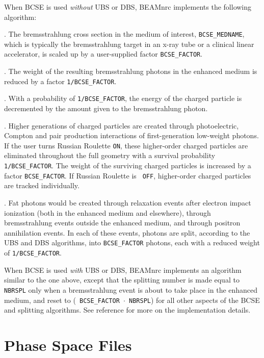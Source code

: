 \documentclass[12pt,twoside]{article}
\begin{document}
When BCSE is used {\em without} UBS or DBS, BEAMnrc implements the following
algorithm\cite{AR07}:

. The bremsstrahlung cross section in the medium of
interest, {\tt BCSE\_MEDNAME}, which is typically the bremsstrahlung target in
an x-ray tube or a clinical linear accelerator,
is scaled up by a user-supplied factor {\tt BCSE\_FACTOR}.

. The weight of the resulting bremsstrahlung photons in the
enhanced medium is reduced by a factor {\tt 1/BCSE\_FACTOR}.

. With a probability of {\tt 1/BCSE\_FACTOR}, the energy of
the charged particle is decremented by the amount given to the
bremsstrahlung photon.

. Higher generations of charged particles are created
through photoelectric, Compton and pair production interactions of
first-generation low-weight photons. If the user turns Russian
Roulette {\tt ON}, these higher-order charged particles are eliminated
throughout the full geometry with a survival probability {\tt
1/BCSE\_FACTOR}. The weight of the surviving charged particles is
increased by a factor {\tt BCSE\_FACTOR}. If Russian Roulette is {\tt
OFF}, higher-order charged particles are tracked individually.

. Fat photons would be created through relaxation events
after electron impact ionization (both in the enhanced medium and
elsewhere), through bremsstrahlung events outside the enhanced medium,
and through positron annihilation events. In each of these events, photons
are split,
according to the UBS and DBS algorithms, into {\tt BCSE\_FACTOR}
photons, each with a reduced weight of {\tt 1/BCSE\_FACTOR}.

\noindent When BCSE is used {\em with} UBS or DBS, BEAMnrc implements
an algorithm similar to the one above, except that the splitting
number is made equal to {\tt NBRSPL} only when a bremsstrahlung event
is about to take place in the enhanced medium, and reset to ({\tt
BCSE\_FACTOR $\cdot$ NBRSPL}) for all other aspects of the BCSE and
splitting algorithms. See reference\cite{AR07} for more on the
implementation details.

\bigskip


\section{Phase Space Files}
\label{PSF}
\end{document}

